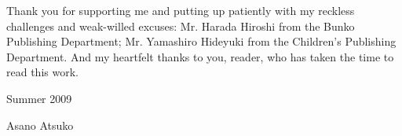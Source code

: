 Thank you for supporting me and putting up patiently with my reckless
challenges and weak-willed excuses: Mr. Harada Hiroshi from the Bunko
Publishing Department; Mr. Yamashiro Hideyuki from the Children's
Publishing Department. And my heartfelt thanks to you, reader, who has
taken the time to read this work.

Summer 2009

Asano Atsuko
